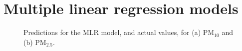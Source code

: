 \section{Multiple linear regression models}

\begin{figure}[h]
\centering
{}
\caption{Predictions for the MLR model, and actual values, for (a) PM$_{10}$ and (b) PM$_{2.5}$.}
\label{fig:MLR_predictions}
\end{figure}

%
%
%
